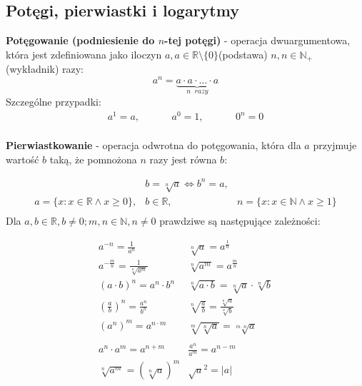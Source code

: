 \documentclass[14pt,a4paper]{extarticle}
\begin{document}
\subsection{Potęgi, pierwiastki i logarytmy}
\textbf{Potęgowanie (podniesienie do $n$-tej potęgi)} - operacja dwuargumentowa, która jest zdefiniowana jako iloczyn $a, a \in \mathbb{R}\setminus\{0\}$(podstawa) $n, n \in \mathbb{N}_{+}$(wykładnik) razy:\
$$a^{n} = \underbrace{a\cdot a \cdot\ldots\cdot a}_{n\;\;razy}$$
Szczególne przypadki:
\begin{equation*}
\begin{array}{ccc}
   a^{1} = a, &\hspace{1cm} a^{0} = 1, &\hspace{1cm} 0^{n} = 0 \\ 
\end{array}
\end{equation*}

\renewcommand{\arraycolsep}{0cm}
\renewcommand{\arraystretch}{2}


\noindent\textbf{Pierwiastkowanie} - operacja odwrotna do potęgowania, która dla $a$ przyjmuje wartość $b$ taką, że pomnożona $n$ razy jest równa $b$:

\begin{equation*}
\begin{array}{ccc}
    & b = \sqrt[n]{a} \Leftrightarrow b^{n} = a, & \\
   a=\{x:x\in\mathbb{R}\land x\geq 0\}, & b\in\mathbb{R}, & n=\{x:x\in\mathbb{N}\land x\geq 1\} \\
\end{array}
\end{equation*}
\noindent Dla $a,b \in \mathbb{R}, b \neq 0; m,n \in \mathbb{N}, n \neq 0 $ prawdziwe są następujące zależności:

\renewcommand{\arraycolsep}{1cm}
\renewcommand{\arraystretch}{2}

\begin{equation*}
\begin{array}{ll}
   a^{-n} = \frac{\displaystyle 1}{\displaystyle a^{n}} & \sqrt[n]{a} = a^{\frac{1}{n}} \\
   a^{-\frac{m}{n}} = \frac{\displaystyle 1}{ \sqrt[n]{\displaystyle a^{m}}} & \sqrt[n]{a^{m}} = a^{\frac{m}{n}}\\
   (a\cdot b)^{n} = a^{n}\cdot b^{n} & \sqrt[n]{a\cdot b} = \sqrt[n]{a} \cdot \sqrt[n]{b} \\
   \left(\frac{\displaystyle a}{\displaystyle b}\right)^{n} = \frac{\displaystyle a^{n}}{\displaystyle b^{n}} & \sqrt[n]{\frac{\displaystyle a}{\displaystyle b}} = \frac{\displaystyle \sqrt[n]{a}}{\displaystyle \sqrt[n]{b}} \\
   (a^{n})^{m} = a^{n\cdot m} & \sqrt[m]{\sqrt[n]{a}} = \sqrt[m\cdot n]{a}\\
   \\
   a^{n}\cdot a^{m} = a^{n+m} & \frac{\displaystyle a^{n}}{\displaystyle a^{m}} = a^{n - m} \\
   \sqrt[n]{a^{m}} = (\sqrt[n]{a})^{m} &  \sqrt{a}^{2} = \lvert a\rvert \\
\end{array}
\end{equation*}
\\
\end{document}
